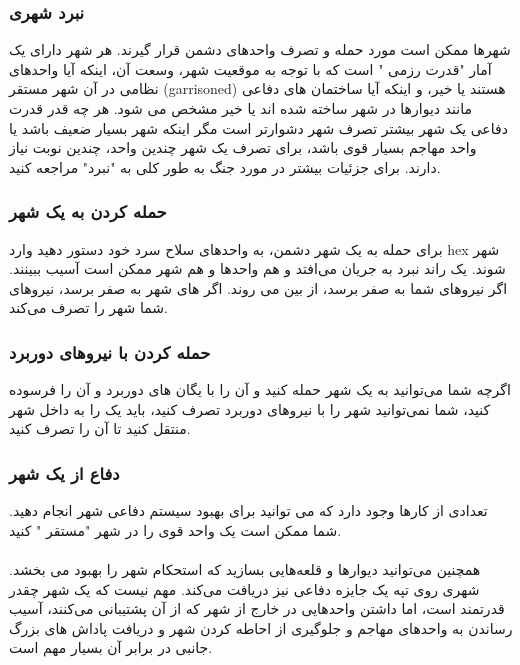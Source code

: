 \documentclass[]{article}
\begin{document}
\subsubsection*{{\titr نبرد شهری}}
شهرها ممکن است مورد حمله و تصرف واحدهای دشمن قرار گیرند. هر شهر دارای یک آمار "قدرت رزمی " است که با توجه به موقعیت شهر، وسعت آن، اینکه آیا واحدهای نظامی در آن شهر مستقر (garrisoned) هستند یا خیر، و اینکه آیا ساختمان های دفاعی مانند دیوارها در شهر ساخته شده اند یا خیر مشخص می شود. هر چه قدر قدرت دفاعی یک شهر بیشتر تصرف شهر دشوارتر است مگر اینکه شهر بسیار ضعیف باشد یا واحد مهاجم بسیار قوی باشد، برای تصرف یک شهر چندین واحد، چندین نوبت نیاز دارند. برای جزئیات بیشتر در مورد جنگ به طور کلی به "نبرد" مراجعه کنید.

\subsubsection*{{\titr حمله کردن به یک شهر}}
برای حمله به یک شهر دشمن، به واحد‌های  سلاح سرد خود دستور دهید وارد hex شهر شوند. یک راند نبرد به جریان می‌­افتد و هم واحد­ها و هم شهر ممکن است آسیب ببینند. اگر  نیرو­های شما به صفر برسد، از بین می روند. اگر  های شهر به صفر برسد، نیروهای شما شهر را تصرف می‌کند.


\subsubsection*{{\titr حمله کردن با نیروهای دوربرد}}
اگرچه شما می‌توانید به یک شهر حمله کنید و آن را با یگان های دوربرد و آن را فرسوده کنید، شما نمی‌توانید شهر را با نیروهای دوربرد تصرف کنید، باید یک  را به داخل شهر منتقل کنید تا آن را تصرف کنید.

\subsubsection*{{\titr دفاع از یک شهر}}
تعدادی از کارها وجود دارد که می توانید برای بهبود سیستم دفاعی شهر انجام دهید. شما ممکن است یک واحد قوی را در شهر "مستقر " کنید.\\
\\
همچنین می‌توانید دیوارها و قلعه‌هایی بسازید که استحکام شهر را بهبود می بخشد. شهری روی تپه یک جایزه دفاعی نیز دریافت می‌کند. مهم نیست که یک شهر چقدر قدرتمند است، اما داشتن واحدهایی در خارج از شهر که از آن پشتیبانی می‌کنند، آسیب رساندن به واحدهای مهاجم و جلوگیری از احاطه کردن شهر و دریافت پاداش های بزرگ جانبی در برابر آن بسیار مهم است.\\
\end{document}
